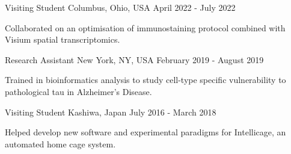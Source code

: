 %
%
%

\vspace*{0.35cm}

\begin{cventries}

    {Visiting Student}
    {Columbus, Ohio, USA}
    {April 2022 - July 2022}
    {\begin{cvitems}
        \item Collaborated on an optimisation of immunostaining protocol combined with Visium spatial transcriptomics.
    \end{cvitems}\vspace{1.5\baselineskip}}

    \vspace*{0.2cm}

    {Research Assistant}
    {New York, NY, USA}
    {February 2019 - August 2019}
    {\begin{cvitems}
        \item Trained in bioinformatics analysis to study cell-type specific vulnerability to pathological tau in Alzheimer's Disease.
    \end{cvitems}\vspace{1.5\baselineskip}}

    \vspace*{0.2cm}

    {Visiting Student}
    {Kashiwa, Japan}
    {July 2016 - March 2018}
    {\begin{cvitems}
        \item Helped develop new software and experimental paradigms for Intellicage, an automated home cage system.
    \end{cvitems}\vspace{1.5\baselineskip}}


\end{cventries}
